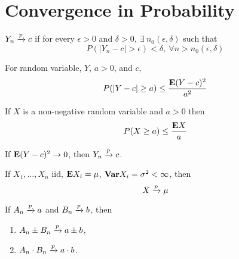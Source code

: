 \section{Convergence in Probability}%
\label{sec:convergence_in_probability}

\begin{definition}
    $Y_n \xrightarrow{p} c$ if for every $\epsilon>0$ and $\delta > 0,\ 
    \exists\ n_0(\epsilon, \delta)$ such that 
    \begin{equation*}
        P(|Y_n - c| > \epsilon) < \delta,\ 
        \forall n > n_0(\epsilon, \delta)
    \end{equation*}
\end{definition}

\begin{thm}
For random variable, $Y$, $a>0$, and $c$,
    \begin{equation*}
        P(|Y-c| \ge a) \le \frac{\mathbf{E} (Y-c)^2}{a^2}
    \end{equation*}    
\end{thm}

\begin{definition}
    If $X$ is a non-negative random variable and $a>0$ then
    \begin{equation*}
        P( X \ge a) \le \frac{\mathbf{E} X}{a}
    \end{equation*}
\end{definition}

\begin{thm}
    If $\mathbf{E} (Y-c)^2 \to 0$, then $Y_n \xrightarrow{p} c$.
\end{thm}

\begin{thm}
    If $X_1, \ldots, X_n$ iid, $\mathbf{E} X_i = \mu$, $\mathbf{Var} X_i = \sigma^2 < \infty$, then
    \begin{equation*}
        \bar{X} \xrightarrow{p} \mu
    \end{equation*}
\end{thm}

\begin{thm}
    If $A_n \xrightarrow{p} a$ and $B_n \xrightarrow{p} b$, then
    \begin{enumerate}
        \item $A_n \pm B_n \xrightarrow{p} a \pm b$,
        \item $A_n \cdot B_n \xrightarrow{p} a \cdot b$.
    \end{enumerate}
\end{thm}

